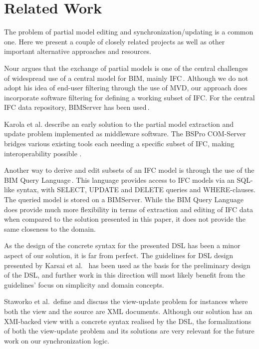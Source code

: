 \section{Related Work}
\label{sec:related_work}
The problem of partial model editing and synchronization/updating is a common one. Here we present a couple of closely related projects as well as other important alternative approaches and resources.

Nour argues that the exchange of partial models is one of the central challenges of widespread use of a central model for BIM, mainly IFC\,\cite{nour08}. Although we do not adopt his idea of end-user filtering through the use of MVD, our approach does incorporate software filtering for defining a working subset of IFC. For the central IFC data repository, BIMServer has been used\,\cite{beetz10}.

Karola et al. describe an early solution to the partial model extraction and update problem implemented as middleware software. The BSPro COM-Server bridges various existing tools each needing a specific subset of IFC, making interoperability possible \cite{karola02}.

Another way to derive and edit subsets of an IFC model is through the use of the BIM Query Language\,\cite{mazairac10}. This language provides access to IFC models via an SQL-like syntax, with SELECT, UPDATE and DELETE queries and WHERE-clauses. The queried model is stored on a BIMServer. While the BIM Query Language does provide much more flexibility in terms of extraction and editing of IFC data when compared to the solution presented in this paper, it does not provide the same closeness to the domain.

As the design of the concrete syntax for the presented DSL has been a minor aspect of our solution, it is far from perfect. The guidelines for DSL design presented by Karsai et al. \,\cite{karsai09} has been used as the basis for the preliminary design of the DSL, and further work in this direction will most likely benefit from the guidelines' focus on simplicity and domain concepts.

Staworko et al.\,\cite{staworko10} define and discuss the view-update problem for instances where both the view and the source are XML documents. Although our solution has an XMI-backed view with a concrete syntax realised by the DSL, the formalizations of both the view-update problem and its solutions are very relevant for the future work on our synchronization logic.


